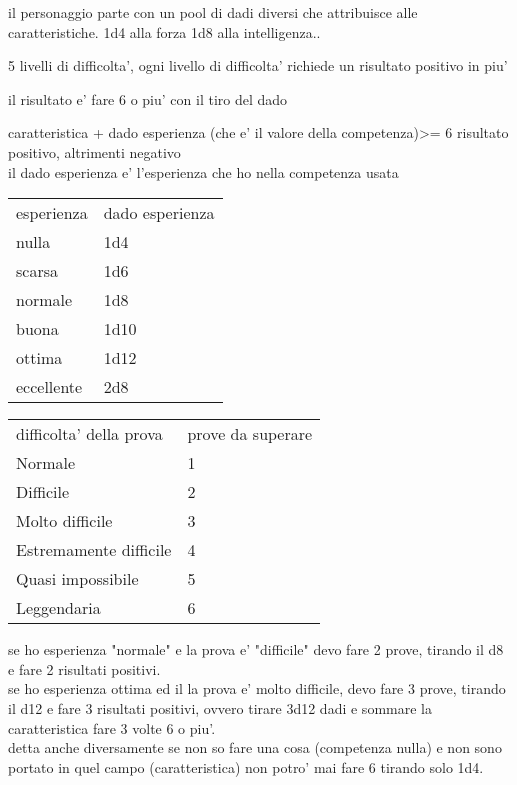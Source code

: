 \documentclass[12pt,a4paper]{book}
\begin{document}
il personaggio parte con un pool di dadi diversi che attribuisce alle caratteristiche.
1d4 alla forza
1d8 alla intelligenza..

5 livelli di difficolta', ogni livello di difficolta' richiede un risultato positivo in piu'

il risultato e' fare 6 o piu' con il tiro del dado

caratteristica  + dado esperienza (che e' il valore della competenza)>= 6 risultato positivo, altrimenti negativo\\
il dado esperienza e' l'esperienza che ho nella competenza usata\\

\medskip

\begin{tabular}{ll}
	\hline
esperienza & dado esperienza\\
nulla		&	1d4	\\
scarsa		&	1d6	\\
normale		&   1d8	\\
buona		&	1d10\\
ottima		&	1d12\\
eccellente	&	2d8\\
\end{tabular}

\medskip

\begin{tabular}{ll}
	\hline
difficolta' della prova & prove da superare\\
	Normale          			& 1\\
	Difficile        			& 2\\
	Molto difficile 	 		& 3\\
	Estremamente difficile			& 4\\
	Quasi impossibile			& 5\\
	Leggendaria      			& 6\\
\end{tabular}

\medskip

se ho esperienza "normale" e la prova e' "difficile" devo fare 2 prove, tirando il d8 e fare 2 risultati positivi.\\
se ho esperienza ottima ed il la prova e' molto difficile, devo fare 3 prove, tirando il d12 e fare 3 risultati positivi, ovvero tirare 3d12 dadi e sommare la caratteristica  fare 3 volte 6 o piu'.\\

detta anche diversamente se non so fare una cosa (competenza nulla) e non sono portato in quel campo (caratteristica) non potro' mai fare 6 tirando solo 1d4.
\end{document}
